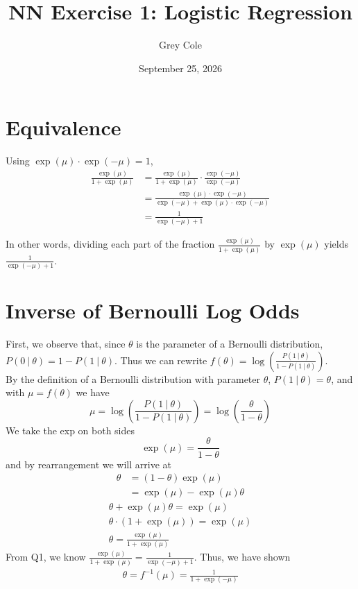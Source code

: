 \documentclass{article}
\title{NN Exercise 1: Logistic Regression}
\date{September 25, 2026}
\author{Grey Cole}
\newcommand{\gv}{%
	\:|\:
}
\begin{document}
	\maketitle
	
	\section{Equivalence}
	Using $\exp(\mu) \cdot \exp(-\mu) = 1$,
	\begin{align*}
		\frac{\exp(\mu)}{1+\exp(\mu)} &= \frac{\exp(\mu)}{1+\exp(\mu)} \cdot \frac{\exp(-\mu)}{\exp(-\mu)}\\
		&= \frac{\exp(\mu) \cdot \exp(-\mu)}{\exp(-\mu) + \exp(\mu) \cdot \exp(-\mu)}\\
		&= \frac{1}{\exp(-\mu) + 1}
	\end{align*}
	
	In other words, dividing each part of the fraction $\frac{\exp(\mu)}{1 + \exp(\mu)}$ by $\exp(\mu)$ yields $\frac{1}{\exp(-\mu) + 1}$.
	
	\section{Inverse of Bernoulli Log Odds}
	First, we observe that, since $\theta$ is the parameter of a Bernoulli distribution, $P(0\gv  \theta) = 1 - P(1\gv \theta)$. Thus we can rewrite $f(\theta) = \log(\frac{P(1\gv \theta)}{1-P(1\gv \theta)})$.\\
	By the definition of a Bernoulli distribution with parameter $\theta$, $P(1\gv \theta) = \theta$, and with $\mu = f(\theta)$ we have 
	\begin{equation*}
		\mu = \log(\frac{P(1\gv \theta)}{1 - P(1\gv \theta)}) = \log(\frac{\theta}{1-\theta})
	\end{equation*}
	We take the exp on both sides
	\begin{equation*}
		\exp(\mu) = \frac{\theta}{1-\theta}
	\end{equation*}
	and by rearrangement we will arrive at
	\begin{align*}
		\theta &= (1-\theta)\exp(\mu)\\
		&= \exp(\mu) - \exp(\mu)\theta
	\end{align*}
	\begin{gather*}
		\theta + \exp(\mu)\theta = \exp(\mu)\\
		\theta\cdot(1 + \exp(\mu)) = \exp(\mu)\\
		\boxed{\theta = \frac{\exp(\mu)}{1 + \exp(\mu)}}
	\end{gather*}
	From Q1, we know $\frac{\exp(\mu)}{1+\exp(\mu)} = \frac{1}{\exp(-\mu) + 1}$. Thus, we have shown
	\begin{align*}
		\boxed{\theta = f^{-1}(\mu) = \frac{1}{1 + \exp(-\mu)}}
	\end{align*}
	
\end{document}
